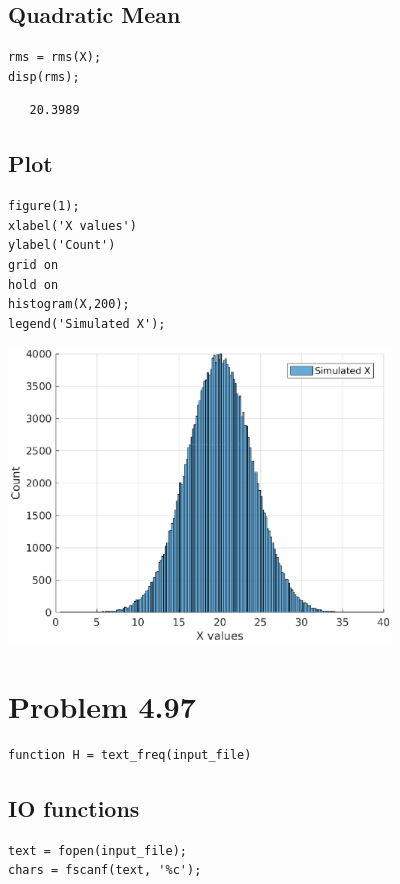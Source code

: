 \documentclass[12pt]{article}
\begin{document}
\subsection*{Quadratic Mean}

\begin{verbatim}
rms = rms(X);
disp(rms);
\end{verbatim}

        \color{lightgray} \begin{verbatim}   20.3989

\end{verbatim} \color{black}

\subsection*{Plot}

\begin{verbatim}
figure(1);
xlabel('X values')
ylabel('Count')
grid on
hold on
histogram(X,200);
legend('Simulated X');
\end{verbatim}

\includegraphics [width=4in]{problem_4_95_01.eps}
\section*{Problem 4.97}

\begin{verbatim}
function H = text_freq(input_file)
\end{verbatim}
\subsection*{IO functions}

\begin{verbatim}
text = fopen(input_file);
chars = fscanf(text, '%c');
\end{verbatim}
   
\end{document}
